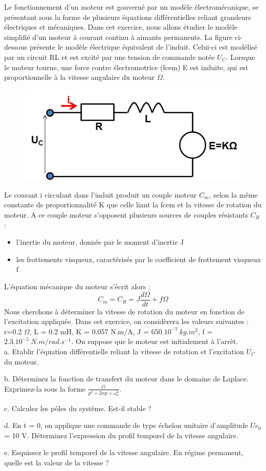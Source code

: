 	Le fonctionnement d'un moteur est gouverné par un modèle électromécanique, se présentant sous la forme de plusieurs équations différentielles reliant grandeurs électriques et mécaniques. Dans cet exercice, nous allons étudier le modèle simplifié d'un moteur à courant continu à aimants permanents. La figure ci-dessous présente le modèle électrique équivalent de l'induit. Celui-ci est modélisé par un circuit RL et est excité par une tension de commande notée $U_{C}$. Lorsque le moteur tourne, une force contre électromotrice (fcem) E est induite, qui est proportionnelle à la vitesse angulaire du moteur $\Omega$. 
	\begin{figure}[h!]
		\centering
		\includegraphics[scale=0.5]{images/Exo3_moteur.jpg} 
	\end{figure}	
	Le courant i circulant dans l'induit produit un couple moteur $C_{m}$, selon la même constante de proportionnalité K que celle liant la fcem et la vitesse de rotation du moteur. A ce couple moteur s'opposent plusieurs sources de couples résistants $C_{R}$ :
	\begin{itemize}
		\item l'inertie du moteur, donnée par le moment d'inertie J
		\item les frottements visqueux, caractérisés par le coefficient de frottement visqueux f
	\end{itemize}
	L'équation mécanique du moteur s'écrit alors :
	\begin{equation*}
	C_{m} = C_{R} = J\frac{d\Omega}{dt}+f\Omega
	\end{equation*}	
	Nous cherchons à déterminer la vitesse de rotation du moteur en fonction de l'excitation appliquée.
	Dans cet exercice, on considèrera les valeurs suivantes : r=0.2 $\Omega$, L = 0.2 mH, K = 0.057 N.m/A, J = $650.10^{-7}~kg.m^{2}$, f = $2.3.10^{-5}~N.m/rad.s^{-1}$. On suppose que le moteur est initialement à l'arrêt.\\
	
	a. Etablir l'équation différentielle reliant la vitesse de rotation et l'excitation $U_{C}$ du moteur.
	
	b. Déterminez la fonction de transfert du moteur dans le domaine de Laplace. Exprimez-la sous la forme $\frac{G}{p^{2}+2\alpha p+\omega_{0}^{2}}$.
	
	c. Calculez les pôles du système. Est-il stable ?
	
	d. En t = 0, on applique une commande de type échelon unitaire d'amplitude $Uc_{0}$ = 10 V. Déterminez l'expression du profil temporel de la vitesse angulaire.
	
	e. Esquissez le profil temporel de la vitesse angulaire. En régime permanent, quelle est la valeur de la vitesse ? 
	
		
	\newpage
	